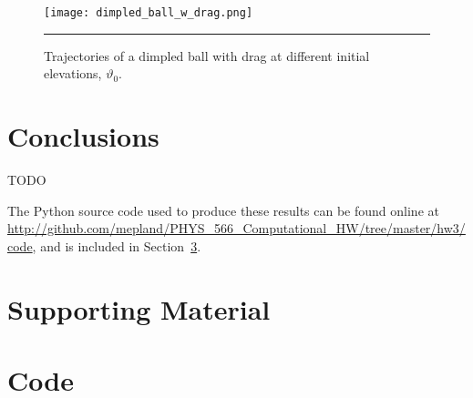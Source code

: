 \documentclass[notitlepage,aps,prd,nofootinbib]{revtex4-1}
\begin{document}
\begin{figure}[!htbc]
  \centering
  \texttt{[image: dimpled\_ball\_w\_drag.png]}
	{\par\nobreak\rule[9pt]{35em}{0.5pt}\vspace{-5mm}}
	\caption{Trajectories of a dimpled ball with drag at different initial elevations, $\vartheta_{0}$.}
	\label{fig:dimpled_ball_w_drag}
\end{figure}



\section{Conclusions}
\label{sec:Conclusions}
TODO

The Python source code used to produce these results can be found online at \url{http://github.com/mepland/PHYS_566_Computational_HW/tree/master/hw3/code}, and is included in Section~\ref{sec:code}.

\clearpage
\section{Supporting Material}
\label{sec:Supporting_Material}


\clearpage


\clearpage
\section{Code}
\label{sec:code}


\end{document}
